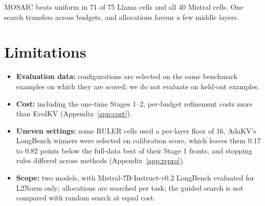 \documentclass[11pt]{article}
\begin{document}
MOSAIC beats uniform in 71 of 75 Llama cells and all 40 Mistral cells. One search transfers across budgets, and allocations favour a few middle layers.

\clearpage
\section*{Limitations}

\begin{itemize}
\item \textbf{Evaluation data:} configurations are selected on the same benchmark examples on which they are scored; we do not evaluate on held-out examples.
\item \textbf{Cost:} including the one-time Stages 1--2, per-budget refinement costs more than EvolKV (Appendix~\ref{app:cost}).
\item \textbf{Uneven settings:} some RULER cells used a per-layer floor of 16, AdaKV's LongBench winners were selected on calibration score, which leaves them 0.17 to 0.82 points below the full-data best of their Stage 1 fronts, and stopping rules differed across methods (Appendix~\ref{app:repro}).
\item \textbf{Scope:} two models, with Mistral-7B-Instruct-v0.2 LongBench evaluated for L2Norm only; allocations are searched per task; the guided search is not compared with random search at equal cost.
\end{itemize}

\FloatBarrier




\end{document}
